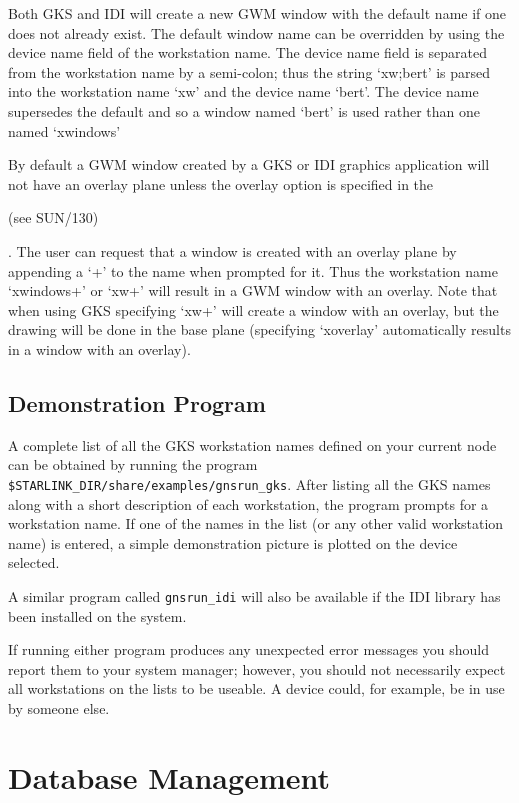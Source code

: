 \documentclass[twoside,11pt,nolof]{starlink}
\begin{document}
Both GKS and IDI will create a new GWM window with the default name
if one does not already exist. The default window name can be overridden
by using the device name field of the workstation name. The device name
field is separated from the workstation name by a semi-colon; thus the
string `xw;bert' is parsed into the workstation name `xw' and the device
name `bert'. The device name supersedes the default and so a window
named `bert' is used rather than one named `xwindows'

By default a GWM window created by a GKS or IDI graphics application
will not have an overlay plane unless the overlay option is specified
in the 
\begin{latexonly}
(see SUN/130)
\end{latexonly}.
The user can request that a window is created
with an overlay plane by appending a `+' to the name when prompted for
it. Thus the workstation name `xwindows+' or `xw+' will result in a
GWM window with an overlay. Note that when using GKS specifying `xw+'
will create a window with an overlay, but the drawing will be done in
the base plane (specifying `xoverlay' automatically results in a window
with an overlay).

\subsection{Demonstration Program}\label{demo-prog}

A complete list of all the GKS workstation names defined on your current node
can be obtained by running the program
\texttt{\$STARLINK\_DIR/share/examples/gnsrun\_gks}.
After listing all the GKS names along with a short description of each
workstation, the program prompts for a workstation name. If one of the names
in the list (or any other valid workstation name) is entered, a simple
demonstration picture is plotted on the device selected.

A similar program called \texttt{gnsrun\_idi} will also be available if the
IDI library has been installed on the system.

If running either program produces any unexpected error messages
you should report them to your system manager; however, you should not
necessarily expect all workstations on the lists to be useable. A device could,
for example, be in use by someone else.

\section{Database Management}\label{dm}
\end{document}
